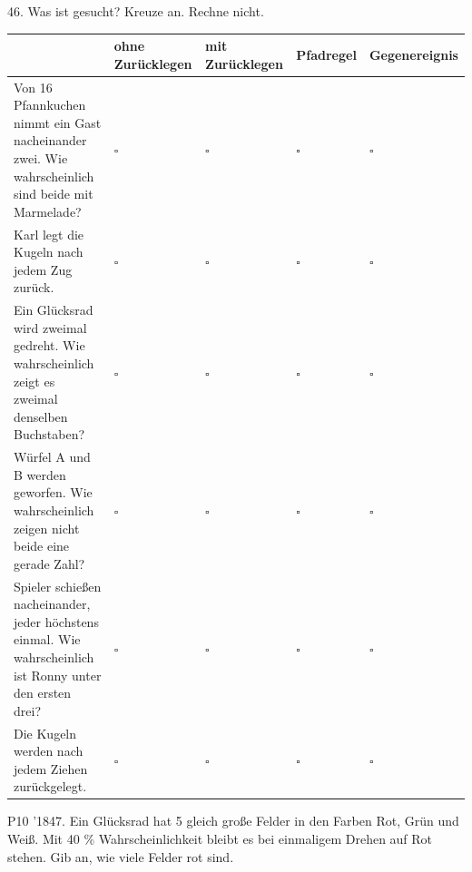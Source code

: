 \documentclass[11pt]{article}
\begin{document}
\begin{pfaufg}{}{46.}{}
Was ist gesucht? Kreuze an. Rechne nicht.
\par\smallskip\noindent \begingroup\renewcommand{\arraystretch}{1.4}\begin{tabular}{|>{\raggedright\arraybackslash}p{4.3cm}|>{\centering\arraybackslash\hyphenpenalty=0}p{1.55cm}|>{\centering\arraybackslash\hyphenpenalty=0}p{1.55cm}|>{\centering\arraybackslash\hyphenpenalty=0}p{1.55cm}|>{\centering\arraybackslash\hyphenpenalty=0}p{1.55cm}|}\hline  & {\scriptsize\hspace{0pt}ohne Zurücklegen} & {\scriptsize\hspace{0pt}mit Zurücklegen} & {\scriptsize\hspace{0pt}Pfadregel} & {\scriptsize\hspace{0pt}Gegenereignis} \\ \hline Von 16 Pfannkuchen nimmt ein Gast nacheinander zwei. Wie wahrscheinlich sind beide mit Marmelade? & $\square$ & $\square$ & $\square$ & $\square$ \\ \hline Karl legt die Kugeln nach jedem Zug zurück. & $\square$ & $\square$ & $\square$ & $\square$ \\ \hline Ein Glücksrad wird zweimal gedreht. Wie wahrscheinlich zeigt es zweimal denselben Buchstaben? & $\square$ & $\square$ & $\square$ & $\square$ \\ \hline Würfel A und B werden geworfen. Wie wahrscheinlich zeigen nicht beide eine gerade Zahl? & $\square$ & $\square$ & $\square$ & $\square$ \\ \hline 11 Spieler schießen nacheinander, jeder höchstens einmal. Wie wahrscheinlich ist Ronny unter den ersten drei? & $\square$ & $\square$ & $\square$ & $\square$ \\ \hline Die Kugeln werden nach jedem Ziehen zurückgelegt. & $\square$ & $\square$ & $\square$ & $\square$ \\ \hline\end{tabular}\endgroup\par
\end{pfaufg}
\pfgruppe{}
\begin{pfaufg}{P10 ’18}{47.}{}
Ein Glücksrad hat 5 gleich große Felder in den Farben Rot, Grün und Weiß. Mit 40 \% Wahrscheinlichkeit bleibt es bei einmaligem Drehen auf Rot stehen. Gib an, wie viele Felder rot sind.
\end{pfaufg}
\end{document}
